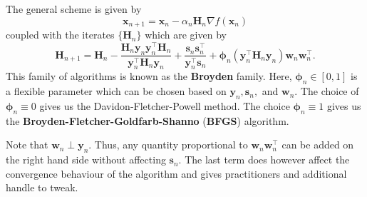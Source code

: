 The general scheme is given by
\[
    \mathbf{x}_{n+1} = \mathbf{x}_n - \alpha_n \mathbf{H}_n \nabla f(\mathbf{x}_n)
\]
coupled with the iterates $\{ \mathbf{H}_n \}$ which are given by
\[
    \mathbf{H}_{n+1} = \mathbf{H}_n - \frac{\mathbf{H}_n \mathbf{y}_n \mathbf{y}_n^{\top}\mathbf{H}_n}{\mathbf{y}_n^{\top} \mathbf{H}_n \mathbf{y}_n} + \frac{\mathbf{s}_n \mathbf{s}_n^{\top}}{\mathbf{y}_n^{\top} \mathbf{s}_n} + \bm{\phi}_n \left( \mathbf{y}_n^{\top} \mathbf{H}_n \mathbf{y}_n \right) \mathbf{w}_n \mathbf{w}_n^{\top}. 
\]
This family of algorithms is known as the \textbf{Broyden} family. Here, $\bm{\phi}_n \in [0,1]$ is a flexible parameter which can be chosen based on $\mathbf{y}_n, \mathbf{s}_n,$ and $\mathbf{w}_n$. The choice of $\bm{\phi}_n \equiv 0$ gives us the Davidon-Fletcher-Powell method. The choice $\bm{\phi}_n \equiv 1$ gives us the \textbf{Broyden-Fletcher-Goldfarb-Shanno} (\textbf{BFGS}) algorithm. 

Note that $\mathbf{w}_n \perp \mathbf{y}_n$. Thus, any quantity proportional to $\mathbf{w}_n\mathbf{w}_n^{\top}$ can be added on the right hand side without affecting $\mathbf{s}_n$. The last term does however affect the convergence behaviour of the algorithm and gives practitioners and additional handle to tweak. 